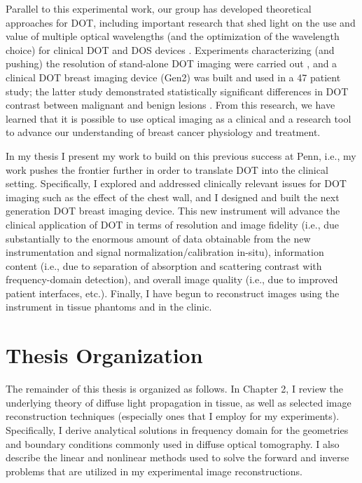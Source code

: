 Parallel to this experimental work, our group has developed theoretical approaches for DOT, including important research that shed light on the use and value of multiple optical wavelengths (and the optimization of the wavelength choice) for clinical DOT and DOS devices \cite{Corlu2003,Corlu2005}. Experiments characterizing (and pushing) the resolution of stand-alone DOT imaging were carried out \cite{Konecky2008a}, and a clinical DOT breast imaging device (Gen2) was built and used in a 47 patient study; the latter study demonstrated statistically significant differences in DOT contrast between malignant and benign lesions \cite{Choe2009}. From this research, we have learned that it is possible to use optical imaging as a clinical and a research tool to advance our understanding of breast cancer physiology and treatment.

In my thesis I present my work to build on this previous success at Penn, i.e., my work pushes the frontier further in order to translate DOT into the clinical setting. Specifically, I explored and addressed clinically relevant issues for DOT imaging such as the effect of the chest wall, and I designed and built the next generation DOT breast imaging device. This new instrument will advance the clinical application of DOT in terms of resolution and image fidelity (i.e., due substantially to the enormous amount of data obtainable from the new instrumentation and signal normalization/calibration in-situ), information content (i.e., due to separation of absorption and scattering contrast with frequency-domain detection), and overall image quality (i.e., due to improved patient interfaces, etc.). Finally, I have begun to reconstruct images using the instrument in tissue phantoms and in the clinic.

\section{Thesis Organization}
The remainder of this thesis is organized as follows. In Chapter 2, I review the underlying theory of diffuse light propagation in tissue, as well as selected image reconstruction techniques (especially ones that I employ for my experiments). Specifically, I derive analytical solutions in frequency domain for the geometries and boundary conditions commonly used in diffuse optical tomography. I also describe the linear and nonlinear methods used to solve the forward and inverse problems that are utilized in my experimental image reconstructions.

